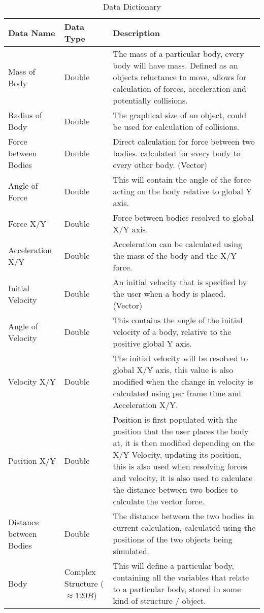 \begin{table}[htbp]
\caption{Data Dictionary}
\centering
\footnotesize
\def\arraystretch{1.5}
\begin{tabular}{|M{3cm}|M{3cm}|m{8cm}|}
\hline 
\textbf{Data Name} & \textbf{Data Type} & \textbf{Description} \\
\hline
Mass of Body & Double & The mass of a particular body, every body will have mass. Defined as an objects reluctance to move, allows for calculation of forces, acceleration and potentially collisions. \\
\hline
Radius of Body & Double & The graphical size of an object, could be used for calculation of collisions. \\
\hline
Force between Bodies & Double & Direct calculation for force between two bodies. calculated for every body to every other body. (Vector) \\
\hline
Angle of Force & Double & This will contain the angle of the force acting on the body relative to global Y axis. \\
\hline
Force X/Y & Double & Force between bodies resolved to global X/Y axis. \\
\hline
Acceleration X/Y & Double & Acceleration can be calculated using the mass of the body and the X/Y force. \\
\hline
Initial Velocity & Double & An initial velocity that is specified by the user when a body is placed. (Vector) \\
\hline
Angle of Velocity & Double & This contains the angle of the initial velocity of a body, relative to the positive global Y axis. \\
\hline
Velocity X/Y & Double & The initial velocity will be resolved to global X/Y axis, this value is also modified when the change in velocity is calculated using per frame time and Acceleration X/Y. \\
\hline
Position X/Y & Double & Position is first populated with the position that the user places the body at, it is then modified depending on the X/Y Velocity, updating its position, this is also used when resolving forces and velocity, it is also used to calculate the distance between two bodies to calculate the vector force. \\
\hline
Distance between Bodies & Double & The distance between the two bodies in current calculation, calculated using the positions of the two objects being simulated. \\
\hline
Body & Complex Structure ($\approx 120B$) & This will define a particular body, containing all the variables that relate to a particular body, stored in some kind of structure / object. \\

\end{tabular}
\end{table}
